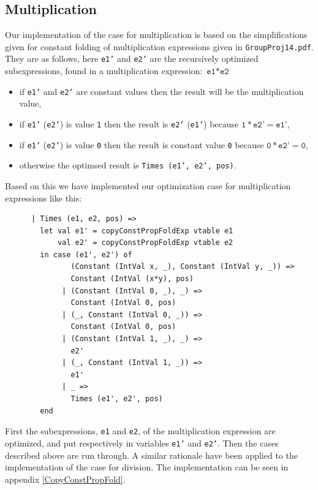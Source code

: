 \documentclass[11pt]{article}
\begin{document}
	\subsection{Multiplication}
	Our implementation of the case for multiplication is based on the simplifications
	given for constant folding of multiplication expressions given in \texttt{GroupProj14.pdf}.
	They are as follows, here \texttt{e1'} and \texttt{e2'} are the recursively optimized
	subexpressions, found in a multiplication expression: $ \texttt{e1} \ast \texttt{e2}$ 
	\begin{itemize}
	\item if \texttt{e1'} and \texttt{e2'} are constant values then the result will be the
			multiplication value,
	\item if \texttt{e1'} (\texttt{e2'}) is value \texttt{1} then the result is \texttt{e2'}
			(\texttt{e1'}) because $\texttt{1} \ast \texttt{e2'} = \texttt{e1'}$,
	\item if \texttt{e1'} (\texttt{e2'}) is value \texttt{0} then the result is constant value
			\texttt{0} because $\texttt{0} \ast \texttt{e2'} = \texttt{0}$,
	\item otherwise the optimsed result is  \texttt{Times (e1', e2', pos)}.
	\end{itemize}
	Based on this we have implemented our optimization case for multiplication expressions like this:
	\begin{lstlisting}
      | Times (e1, e2, pos) =>
        let val e1' = copyConstPropFoldExp vtable e1
            val e2' = copyConstPropFoldExp vtable e2
        in case (e1', e2') of
               (Constant (IntVal x, _), Constant (IntVal y, _)) =>
               Constant (IntVal (x*y), pos)
             | (Constant (IntVal 0, _), _) =>
               Constant (IntVal 0, pos)
             | (_, Constant (IntVal 0, _)) =>
               Constant (IntVal 0, pos)
             | (Constant (IntVal 1, _), _) =>
               e2'
             | (_, Constant (IntVal 1, _)) =>
               e1'
             | _ =>
               Times (e1', e2', pos)
        end
	\end{lstlisting}
	First the subexpressions, \texttt{e1} and \texttt{e2}, of the multiplication expression are
	optimized, and put respectively in variables \texttt{e1'} and \texttt{e2'}.
	Then the cases described above are run through. A similar rationale have been applied to the
	implementation of the case for division. The implementation can be seen in appendix \ref{CopyConstPropFold}.
\end{document}
